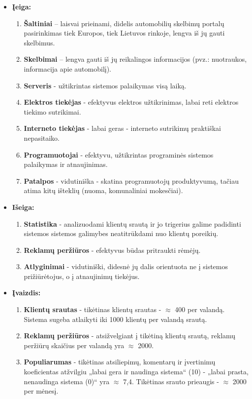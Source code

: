 \documentclass[12pt]{article}
\begin{document}
	\begin{itemize}
	\item{\textbf{Įeiga:}}
	\begin{enumerate}
		\item{\textbf{Šaltiniai} – laisvai prieinami, didelis automobilių skelbimų portalų pasirinkimas tiek Europos, tiek Lietuvos rinkoje, lengva iš jų gauti skelbimus.}
		\item{\textbf{Skelbimai} – lengva gauti iš jų reikalingos informacijos (pvz.: nuotraukos, informacija apie automobilį).}
		\item{\textbf{Serveris} - užtikrintas sistemos palaikymas visą laiką.}
		\item{\textbf{Elektros tiekėjas} - efektyvus elektros užtikrinimas, labai reti elektros tiekimo sutrikimai.}
		\item{\textbf{Interneto tiekėjas} - labai geras - interneto sutrikimų praktiškai nepasitaiko.}
		\item{\textbf{Programuotojai} - efektyvu, užtikrintas programinės sistemos palaikymas ir atnaujinimas.}
		\item{\textbf{Patalpos} - vidutiniška - skatina programuotojų produktyvumą, tačiau atima kitų išteklių (nuoma, komunaliniai mokesčiai).}
	\end{enumerate}

	\item{\textbf{Išeiga:}}
	\begin{enumerate}
		\item{\textbf{Statistika} - analizuodami klientų srautą ir jo trigerius galime padidinti sistemos sistemos galimybes neatitrūkdami nuo klientų poreikių.}
		\item{\textbf{Reklamų peržiūros} - efektyvus būdas pritraukti rėmėjų.}
		\item{\textbf{Atlyginimai} - vidutiniški, didesnė jų dalis orientuota ne į sistemos prižiūrėtojus, o į atnaujinimų tiekėjus.}
	\end{enumerate}
	\pagebreak
	
	\item{\textbf{Įvaizdis:}}
	\begin{enumerate}
		\item{\textbf{Klientų srautas} - tikėtinas klientų srautas - $\approx$ 400 per valandą. Sistema sugeba atlaikyti iki 1000 klientų per valandą srautą.}
		\item{\textbf{Reklamų peržiūros} - atsižvelgiant į tikėtiną klientų srautą, reklamų peržiūrų skaičius per valandą yra $\approx$ 2000.}
		\item{\textbf{Populiarumas} - tikėtinas atsiliepimų, komentarų ir įvertinimų koeficientas atžvilgiu „labai gera ir naudinga sistema“ (10) - „labai prasta, nenaudinga sistema (0)“ yra $\approx$ 7,4. Tikėtinas srauto prieaugis - $\approx$ 2000 per mėnesį.}
	\end{enumerate}


\end{itemize}
\end{document}
